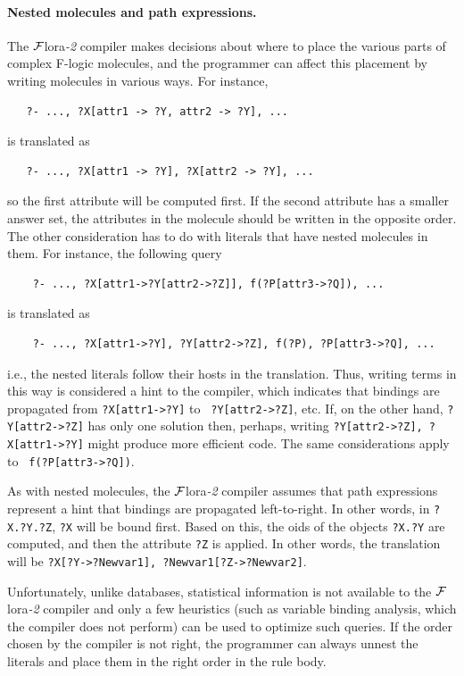 \documentclass[11pt]{article}
\newcommand{\FLORA}{{\mbox{\sc ${\cal F}${lora}\rm\emph{-2}}}\xspace}
\begin{document}
\paragraph{Nested molecules and path expressions.}
The \FLORA compiler makes decisions about
where to place the various parts of complex F-logic molecules, and the
programmer can affect this placement by writing molecules in various ways.
For instance,
\begin{verbatim}
   ?- ..., ?X[attr1 -> ?Y, attr2 -> ?Y], ...
\end{verbatim}
is translated as
\begin{verbatim}
   ?- ..., ?X[attr1 -> ?Y], ?X[attr2 -> ?Y], ...  
\end{verbatim}
so the first attribute will be computed first. If the second attribute has
a smaller answer set, the attributes in the molecule should be written in
the opposite order. The other consideration has to do with literals that
have nested molecules in them. For instance, the following query
\begin{verbatim}
    ?- ..., ?X[attr1->?Y[attr2->?Z]], f(?P[attr3->?Q]), ...
\end{verbatim}
is translated as
\begin{verbatim}
    ?- ..., ?X[attr1->?Y], ?Y[attr2->?Z], f(?P), ?P[attr3->?Q], ...
\end{verbatim}
i.e., the nested literals follow their hosts in the translation.
Thus, writing terms in this way is considered a hint to the compiler, which
indicates that bindings are propagated from {\tt ?X[attr1->?Y]} to {\tt
  ?Y[attr2->?Z]}, etc. If, on the other hand, {\tt ?Y[attr2->?Z]} has only one
solution then, perhaps, writing {\tt ?Y[attr2->?Z], ?X[attr1->?Y]} might
produce more efficient code.  The same considerations apply to {\tt
  f(?P[attr3->?Q])}.

As with nested molecules, the \FLORA compiler assumes that path
expressions represent a hint that bindings are propagated left-to-right.
In other words, in {\tt ?X.?Y.?Z}, {\tt ?X} will be bound first.
Based on this, the oids of the objects {\tt ?X.?Y} are computed, and
then the attribute {\tt ?Z} is applied. In other words, the translation will
be {\tt ?X[?Y->?Newvar1], ?Newvar1[?Z->?Newvar2]}.

Unfortunately, unlike databases, statistical information is not
available to the \FLORA compiler and only a few heuristics (such as
variable binding analysis, which the compiler does not perform) can be used
to optimize such queries. If the order chosen by the compiler is not right,
the programmer can always unnest the literals and place them in the right
order in the rule body.
\end{document}
